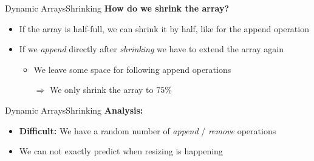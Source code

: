 


\begin{frame}{Dynamic Arrays}{Shrinking}
  \textbf{How do we shrink the array?}
  \begin{itemize}
    \item
      If the array is half-full, we can shrink it by half,
      like for the append operation
    \item
      If we \textit{append} directly after \textit{shrinking} we have to
      extend the array again
      \begin{itemize}
        \item
          We leave some space for following append operations
        \item[$\Rightarrow$]
          We only shrink the array to $75\%$ 
       \end{itemize}
  \end{itemize}
\end{frame}


\begin{frame}{Dynamic Arrays}{Shrinking}
  \textbf{Analysis:}
  \begin{itemize}
    \item
      \textbf{Difficult:}
      We have a random number of \textit{append} / \textit{remove} operations
    \item
      We can not exactly predict when resizing is happening
  \end{itemize}
\end{frame}
